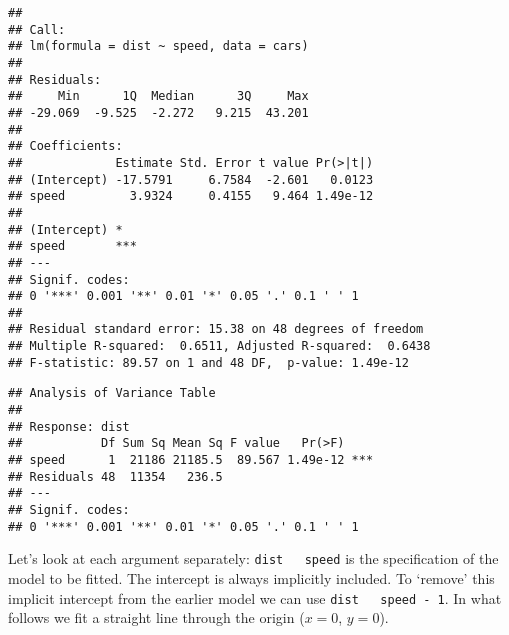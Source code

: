 \documentclass[paper=a4,headsepline,BCOR=12mm,twoside,open=right,%
titlepage,headings=small,fontsize=10pt,index=totoc,bibliography=totoc,%
captions=tableheading,captions=nooneline]{scrbook}\usepackage{knitr}
\begin{document}
\begin{knitrout}\footnotesize
{}\color{fgcolor}\begin{kframe}
\begin{alltt}
 
\end{alltt}
\begin{verbatim}
## 
## Call:
## lm(formula = dist ~ speed, data = cars)
## 
## Residuals:
##     Min      1Q  Median      3Q     Max 
## -29.069  -9.525  -2.272   9.215  43.201 
## 
## Coefficients:
##             Estimate Std. Error t value Pr(>|t|)
## (Intercept) -17.5791     6.7584  -2.601   0.0123
## speed         3.9324     0.4155   9.464 1.49e-12
##                
## (Intercept) *  
## speed       ***
## ---
## Signif. codes:  
## 0 '***' 0.001 '**' 0.01 '*' 0.05 '.' 0.1 ' ' 1
## 
## Residual standard error: 15.38 on 48 degrees of freedom
## Multiple R-squared:  0.6511,	Adjusted R-squared:  0.6438 
## F-statistic: 89.57 on 1 and 48 DF,  p-value: 1.49e-12
\end{verbatim}
\begin{alltt}
 
\end{alltt}
\begin{verbatim}
## Analysis of Variance Table
## 
## Response: dist
##           Df Sum Sq Mean Sq F value   Pr(>F)    
## speed      1  21186 21185.5  89.567 1.49e-12 ***
## Residuals 48  11354   236.5                     
## ---
## Signif. codes:  
## 0 '***' 0.001 '**' 0.01 '*' 0.05 '.' 0.1 ' ' 1
\end{verbatim}
\end{kframe}
\end{knitrout}

Let's look at each argument separately: \texttt{dist ~ speed} is the specification of the model to be fitted. The intercept is always implicitly included. To `remove' this implicit intercept from the earlier model we can use \texttt{dist ~ speed - 1}. In what follows we fit a straight line through the origin ($x = 0$, $y = 0$).
\end{document}
